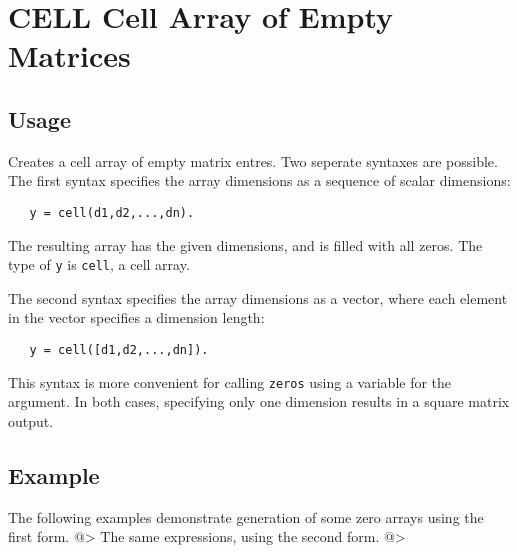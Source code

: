 \section{CELL Cell Array of Empty Matrices}

\subsection{Usage}

Creates a cell array of empty matrix entres.  Two seperate 
syntaxes are possible.  The first syntax specifies the array 
dimensions as a sequence of scalar dimensions:
\begin{verbatim}
   y = cell(d1,d2,...,dn).
\end{verbatim}
The resulting array has the given dimensions, and is filled with
all zeros.  The type of \verb|y| is \verb|cell|, a cell array.  
    
The second syntax specifies the array dimensions as a vector,
where each element in the vector specifies a dimension length:
\begin{verbatim}
   y = cell([d1,d2,...,dn]).
\end{verbatim}
This syntax is more convenient for calling \verb|zeros| using a 
variable for the argument.  In both cases, specifying only one
dimension results in a square matrix output.
\subsection{Example}

The following examples demonstrate generation of some zero arrays 
using the first form.
@>
The same expressions, using the second form.
@>
